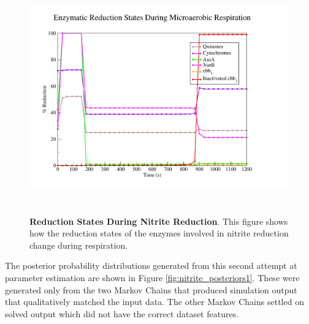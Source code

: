 \begin{figure}[tbp]
 \centering
 \includegraphics[height=10cm, trim=1cm 1cm 3cm 1cm, clip=true]{./07-nitritereduction/data/dataset2redox-2.pdf}
 \caption[Reduction States During Nitrite Reduction]{{\bf Reduction States During Nitrite Reduction}. This figure shows how the reduction states of the enzymes involved in nitrite reduction change during respiration.
  \label{fig:nitrite_ds2_redox2}}
\end{figure}

The posterior probability distributions generated from this second attempt at parameter estimation are shown in Figure \ref{fig:nitrite_posteriors1}. These were generated only from the two Markov Chains that produced simulation output that qualitatively matched the input data. The other Markov Chains settled on solved output which did not have the correct dataset features.

